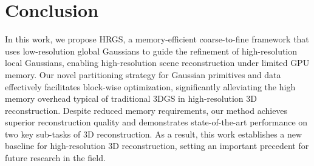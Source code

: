 \section{Conclusion}
In this work, we propose HRGS, a memory-efficient coarse-to-fine framework that uses low-resolution global Gaussians to guide the refinement of high-resolution local Gaussians, enabling high-resolution scene reconstruction under limited GPU memory. 
Our novel partitioning strategy for Gaussian primitives and data effectively facilitates block-wise optimization, significantly alleviating the high memory overhead typical of traditional 3DGS in high-resolution 3D reconstruction. Despite reduced memory requirements, our method achieves superior reconstruction quality and demonstrates state-of-the-art performance on two key sub-tasks of 3D reconstruction. 
As a result, this work establishes a new baseline for high-resolution 3D reconstruction, setting an important precedent for future research in the field.
